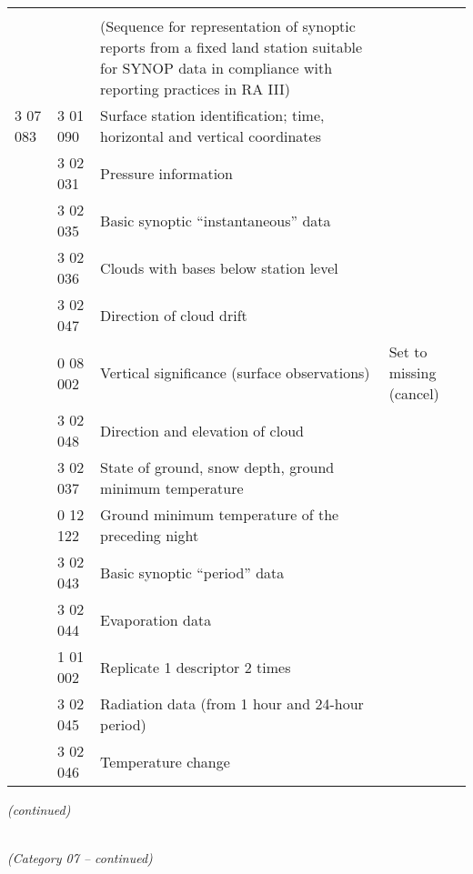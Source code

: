 \begin{longtable}[]{@{}llll@{}}
& & &\tabularnewline
& & (Sequence for representation of synoptic reports from a fixed land station suitable for SYNOP data in compliance with reporting practices in RA III) &\tabularnewline
3 07 083 & 3 01 090 & Surface station identification; time, horizontal and vertical coordinates &\tabularnewline
& 3 02 031 & Pressure information &\tabularnewline
& 3 02 035 & Basic synoptic ``instantaneous'' data &\tabularnewline
& 3 02 036 & Clouds with bases below station level &\tabularnewline
& 3 02 047 & Direction of cloud drift &\tabularnewline
& 0 08 002 & Vertical significance (surface observations) & Set to missing (cancel)\tabularnewline
& 3 02 048 & Direction and elevation of cloud &\tabularnewline
& 3 02 037 & State of ground, snow depth, ground minimum temperature &\tabularnewline
& 0 12 122 & Ground minimum temperature of the preceding night &\tabularnewline
& 3 02 043 & Basic synoptic ``period'' data &\tabularnewline
& 3 02 044 & Evaporation data &\tabularnewline
& 1 01 002 & Replicate 1 descriptor 2 times &\tabularnewline
& 3 02 045 & Radiation data (from 1 hour and 24-hour period) &\tabularnewline
& 3 02 046 & Temperature change &\tabularnewline
\bottomrule
\end{longtable}

\emph{(continued)}

\emph{\\
(Category 07 -- continued)}

